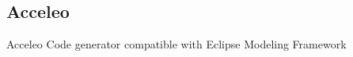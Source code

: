 \subsection{Acceleo}
\begin{frame}{\insertsubsection{}}
	\begin{fancycolumns}[animation=none, columns=3, widths={25,45}]
		\begin{example}{Acceleo}
			Code generator compatible with Eclipse Modeling Framework
		\end{example} \pause
		\centering{} \pause
		\nextcolumn
		\centering{} \pause
		\nextcolumn
		\centering{}
	\end{fancycolumns}
\end{frame}

%		
%		

